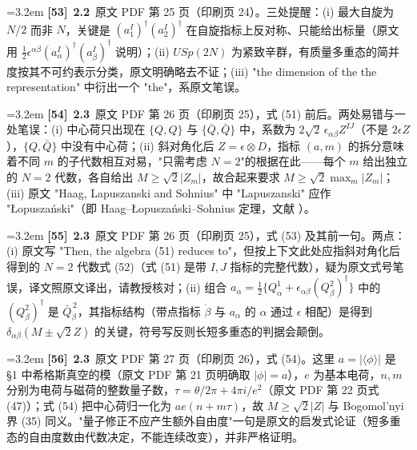 \par
\par\medskip\noindent\hangindent=3.2em \textbf{[53]}~\textbf{2.2}~原文 PDF 第 25 页（印刷页 24）。三处提醒：(i) 最大自旋为 $N/2$ 而非 $N$，关键是 $(a^I_1)^\dagger(a^I_2)^\dagger$ 在自旋指标上反对称、只能给出标量（原文用 $\frac12\epsilon^{\alpha\beta}(a^I_\alpha)^\dagger(a^I_\beta)^\dagger$ 说明）；(ii) $USp(2N)$ 为紧致辛群，有质量多重态的简并度按其不可约表示分类，原文明确略去不证；(iii) "the dimension of the the representation" 中衍出一个 "the"，系原文笔误。
\par
\par\medskip\noindent\hangindent=3.2em \textbf{[54]}~\textbf{2.3}~原文 PDF 第 26 页（印刷页 25），式 (51) 前后。两处易错与一处笔误：(i) 中心荷只出现在 $\{Q,Q\}$ 与 $\{\bar Q,\bar Q\}$ 中，系数为 $2\sqrt2\,\epsilon_{\alpha\beta}Z^{IJ}$（不是 $2\epsilon Z$），$\{Q,\bar Q\}$ 中没有中心荷；(ii) 斜对角化后 $Z=\epsilon\otimes D$，指标 $(a,m)$ 的拆分意味着不同 $m$ 的子代数相互对易，"只需考虑 $N=2$"的根据在此——每个 $m$ 给出独立的 $N=2$ 代数，各自给出 $M\geq\sqrt2|Z_m|$，故合起来要求 $M\geq\sqrt2\max_m|Z_m|$；(iii) 原文 "Haag, Lapuszanski and Sohnius" 中 "Lapuszanski" 应作 "Łopuszański"（即 Haag--Łopuszański--Sohnius 定理，文献 \cite{HLS}）。
\par
\par\medskip\noindent\hangindent=3.2em \textbf{[55]}~\textbf{2.3}~原文 PDF 第 26 页（印刷页 25），式 (53) 及其前一句。两点：(i) 原文写 "Then, the algebra (51) reduces to"，但按上下文此处应指斜对角化后得到的 $N=2$ 代数式 (52)（式 (51) 是带 $I,J$ 指标的完整代数），疑为原文式号笔误，译文照原文译出，请教授核对；(ii) 组合 $a_\alpha=\frac12\{Q^1_\alpha+\epsilon_{\alpha\beta}(Q^2_\beta)^\dagger\}$ 中的 $(Q^2_\beta)^\dagger$ 是 $\bar Q_{\dot\beta}^{\,2}$，其指标结构（带点指标 $\dot\beta$ 与 $a_\alpha$ 的 $\alpha$ 通过 $\epsilon$ 相配）是得到 $\delta_{\alpha\beta}(M\pm\sqrt2Z)$ 的关键，符号写反则长短多重态的判据会颠倒。
\par
\par\medskip\noindent\hangindent=3.2em \textbf{[56]}~\textbf{2.3}~原文 PDF 第 27 页（印刷页 26），式 (54)。这里 $a=|\langle\phi\rangle|$ 是 §1 中希格斯真空的模（原文 PDF 第 21 页明确取 $|\phi|=a$），$e$ 为基本电荷，$n,m$ 分别为电荷与磁荷的整数量子数，$\tau=\theta/2\pi+4\pi i/e^2$（原文 PDF 第 22 页式 (47)）；式 (54) 把中心荷归一化为 $ae(n+m\tau)$，故 $M\geq\sqrt2|Z|$ 与 Bogomol'nyi 界 (35) 同义。"量子修正不应产生额外自由度"一句是原文的启发式论证（短多重态的自由度数由代数决定，不能连续改变），并非严格证明。
